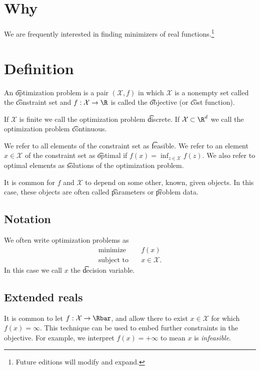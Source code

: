 
\section*{Why}

We are frequently interested in finding minimizers of real functions.\footnote{Future editions will modify and expand.}

\section*{Definition}

An \t{optimization problem} is a pair $(\mathcal{X} , f)$ in which $\mathcal{X} $ is a nonempty set called the \t{constraint set} and $f: \mathcal{X}  \to \R $ is called the \t{objective} (or \t{cost function}).

If $\mathcal{X} $ is finite we call the optimization problem \t{discrete}.
If $\mathcal{X}  \subset \R ^d$ we call the optimization problem \t{continuous}.

We refer to all elements of the constraint set as \t{feasible}.
We refer to an element $x \in \mathcal{X} $ of the constraint set as \t{optimal} if $f(x) = \inf_{z \in \mathcal{X} }f(z)$.
We also refer to optimal elements as \t{solutions} of the optimization problem.

It is common for $f$ and $\mathcal{X} $ to depend on some other, known, given objects.
In this case, these objects are often called \t{parameters} or \t{problem data}.

\subsection*{Notation}

We often write optimization problems as
\[
\begin{aligned}
\text{minimize}\quad & f(x) \\
\text{subject to}\quad & x \in \mathcal{X} .
\end{aligned}
\]
In this case we call $x$ the \t{decision variable}.

\subsection*{Extended reals}

It is common to let $f: \mathcal{X}  \to \Rbar$, and allow there to exist $x \in \mathcal{X} $ for which $f(x) = \infty$.
This technique can be used to embed further constraints in the objective.
For example, we interpret $f(x) = +\infty$ to mean $x$ is \textit{infeasible}.

